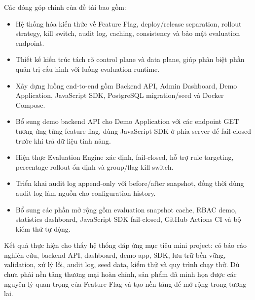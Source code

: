 \documentclass[11pt]{report}
\begin{document}
Các đóng góp chính của đề tài bao gồm:

\begin{itemize}
    \item Hệ thống hóa kiến thức về Feature Flag, deploy/release separation, rollout strategy, kill switch, audit log, caching, consistency và bảo mật evaluation endpoint.
    \item Thiết kế kiến trúc tách rõ control plane và data plane, giúp phân biệt phần quản trị cấu hình với luồng evaluation runtime.
    \item Xây dựng luồng end-to-end gồm Backend API, Admin Dashboard, Demo Application, JavaScript SDK, PostgreSQL migration/seed và Docker Compose.
    \item Bổ sung demo backend API cho Demo Application với các endpoint GET tương ứng từng feature flag, dùng JavaScript SDK ở phía server để fail-closed trước khi trả dữ liệu tính năng.
    \item Hiện thực Evaluation Engine xác định, fail-closed, hỗ trợ rule targeting, percentage rollout ổn định và group/flag kill switch.
    \item Triển khai audit log append-only với before/after snapshot, đồng thời dùng audit log làm nguồn cho configuration history.
    \item Bổ sung các phần mở rộng gồm evaluation snapshot cache, RBAC demo, statistics dashboard, JavaScript SDK fail-closed, GitHub Actions CI và bộ kiểm thử tự động.
\end{itemize}

Kết quả thực hiện cho thấy hệ thống đáp ứng mục tiêu mini project: có báo cáo nghiên cứu, backend API, dashboard, demo app, SDK, lưu trữ bền vững, validation, xử lý lỗi, audit log, seed data, kiểm thử và quy trình chạy thử. Dù chưa phải nền tảng thương mại hoàn chỉnh, sản phẩm đã minh họa được các nguyên lý quan trọng của Feature Flag và tạo nền tảng để mở rộng trong tương lai.

\tableofcontents
\listoffigures
\listoftables
\lstlistoflistings		%

\newpage
\setcounter{page}{0}

 



\renewcommand{\bibname}{Tài liệu tham khảo}
\printbibliography

% 
\end{document}
